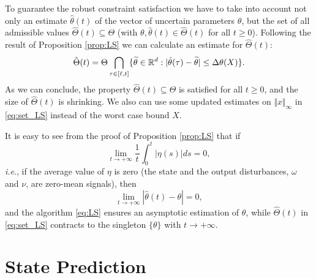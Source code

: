 \documentclass[letterpaper, 10 pt, conference]{ieeeconf}  %
\begin{document}
To guarantee the robust constraint satisfaction we have to take into
account not only an estimate $\hat{\theta}(t)$ of the vector of uncertain
parameters $\theta$, but the set of all admissible values $\hat{\Theta}(t)\subseteq\Theta$
(with $\theta,\hat{\theta}(t)\in\hat{\Theta}(t)$ for all $t\geq0$).
Following the result of Proposition \ref{prop:LS} we can calculate
an estimate for $\hat{\Theta}(t)$:
\begin{equation}
\hat{\Theta}(t)=\Theta\bigcap_{\tau\in[\ell,t]}\{\widetilde{\theta}\in\mathbb{R}^{d}:|\hat{\theta}(\tau)-\widetilde{\theta}|\leq\Delta\theta(X)\}.\label{eq:set_LS}
\end{equation}
As we can conclude, the property $\hat{\Theta}(t)\subseteq\Theta$
is satisfied for all $t\geq0$, and the size of $\hat{\Theta}(t)$
is shrinking. We also can use some updated estimates on $\Vert x\Vert_{\infty}$
in \eqref{eq:set_LS} instead of the worst case bound $X$.
\begin{remark}
It is easy to see from the proof of Proposition \ref{prop:LS} that
if
\[
\lim_{t\to+\infty}\frac{1}{t}\int_{0}^{t}|\eta(s)|ds=0,
\]
\emph{i.e}., if the average value of $\eta$ is zero (the state and
the output disturbances, $\omega$ and $\nu$, are zero-mean signals),
then
\[
\lim_{t\to+\infty}|\hat{\theta}(t)-\theta|=0,
\]
and the algorithm \eqref{eq:LS} ensures an asymptotic estimation
of $\theta$, while $\hat{\Theta}(t)$ in \eqref{eq:set_LS} contracts
to the singleton $\{\theta\}$ with $t\to+\infty$.
\end{remark}

\section{\label{sec:prediction} State Prediction}
\end{document}
